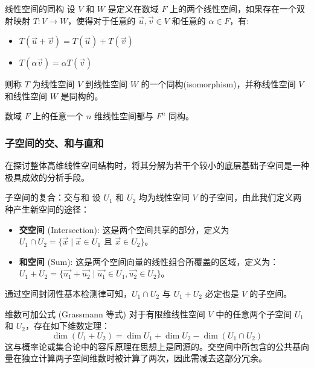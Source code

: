 \documentclass[a4paper,12pt]{ctexart}
\begin{document}
    \begin{mydef}{线性空间的同构}{}
    设 $V$ 和 $W$ 是定义在数域 $F$ 上的两个线性空间，如果存在一个双射映射 $T: V \to W$，使得对于任意的 $\vec{u}, \vec{v} \in V$ 和任意的 $\alpha \in F$，有:
    \begin{itemize}
        \item $T(\vec{u} + \vec{v}) = T(\vec{u}) + T(\vec{v})$
        \item $T(\alpha \vec{v}) = \alpha T(\vec{v})$
    \end{itemize}
    则称 $T$ 为线性空间 $V$ 到线性空间 $W$ 的一个同构(isomorphism)，并称线性空间 $V$ 和线性空间 $W$ 是同构的。
    \end{mydef}
    
    \begin{mythm}{}{}
        数域 $F$ 上的任意一个 $n$ 维线性空间都与 $F^n$ 同构。
    \end{mythm}

\subsubsection{子空间的交、和与直和}

    在探讨整体高维线性空间结构时，将其分解为若干个较小的底层基础子空间是一种极具成效的分析手段。

    \begin{mydef}{子空间的复合：交与和}{}
        设 $U_1$ 和 $U_2$ 均为线性空间 $V$ 的子空间，由此我们定义两种产生新空间的途径：
        \begin{itemize}
            \item \textbf{交空间} (Intersection): 这是两个空间共享的部分，定义为 $U_1 \cap U_2 = \{\vec{x} \mid \vec{x} \in U_1 \text{ 且 } \vec{x} \in U_2\}$。
            \item \textbf{和空间} (Sum): 这是两个空间向量的线性组合所覆盖的区域，定义为：$U_1 + U_2 = \{\vec{u_1} + \vec{u_2} \mid \vec{u_1} \in U_1, \vec{u_2} \in U_2\}$。
        \end{itemize}
        通过空间封闭性基本检测律可知，$U_1 \cap U_2$ 与 $U_1 + U_2$ 必定也是 $V$ 的子空间。
    \end{mydef}

    \begin{mythm}{维数可加公式 (Grassmann 等式)}{}
        对于有限维线性空间 $V$ 中的任意两个子空间 $U_1$ 和 $U_2$，存在如下维数定理：
        \[
        \dim(U_1 + U_2) = \dim U_1 + \dim U_2 - \dim(U_1 \cap U_2)
        \]
        这与概率论或集合论中的容斥原理在思想上是同源的。交空间中所包含的公共基向量在独立计算两子空间维数时被计算了两次，因此需减去这部分冗余。
    \end{mythm}
\end{document}
